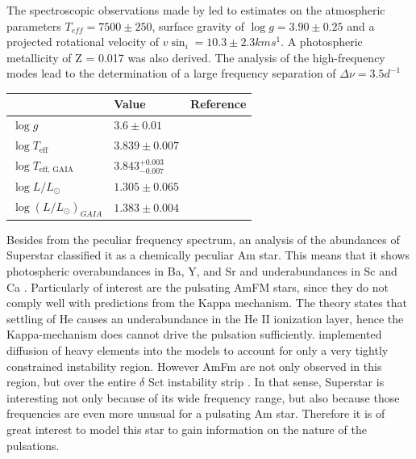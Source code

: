 The spectroscopic observations made by \citet{antoci2011excitation} led to estimates on the atmospheric parameters $T_{eff} = 7500 \pm 250$, surface gravity of $\log g = 3.90 \pm 0.25$ and a projected rotational velocity of $v \sin_i = 10.3 \pm 2.3 kms^1$. A photospheric metallicity of Z = 0.017 was also derived. The analysis of the high-frequency modes lead to the determination of a large frequency separation of $\Delta \nu = 3.5 d^{-1}$


\begin{table}[htbp]
	\centering
	\begin{tabular}{|l|ll|}
		\hline
		& Value                                             & Reference \\ \hline
		$\log g$                                  &  $3.6 \pm 0.01$                            & \citep{zima2007high}    \\
		$\log T_\text{eff}$             & $3.839  \pm 0.007$                   &   \citep{lenz2010delta}   \\
		$\log T_\text{eff, GAIA}$ &  $3.843^{+0.003}_{-0.007}$ & \citep{brown2018gaia} \\
		$\log L/L_\odot$                  &  $1.305 \pm 0.065$                          & \citep{lenz2010delta}     \\
		$\log (L/L_\odot)_{GAIA}$& $1.383 \pm 0.004$                        &  \citep{brown2018gaia}   \\ \hline
	\end{tabular}
\end{table}

Besides from the peculiar frequency spectrum, an analysis of the abundances of Superstar classified it as a chemically peculiar Am star. This means that it shows photospheric overabundances in Ba, Y, and Sr and underabundances in Sc and Ca \citep{preston1974chemically}. Particularly of interest are the pulsating AmFM stars, since they do not comply well with predictions from the Kappa mechanism. The theory states that settling of He causes an underabundance in the He II ionization layer, hence the Kappa-mechanism does cannot drive the pulsation sufficiently. \citet{turcotte2000} implemented diffusion of heavy elements into the models to account for only a very tightly constrained instability region. However AmFm are not only observed in this region, but over the entire $\delta$ Sct instability strip \citep{smalley2011superwasp, balona2011kepler}. In that sense, Superstar is interesting not only because of its wide frequency range, but also because those frequencies are even more unusual for a pulsating Am star. Therefore it is of great interest to model this star to gain information on the nature of the pulsations. 
\\


